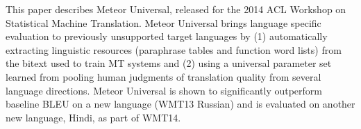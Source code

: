 This paper describes Meteor Universal, released for the 2014 ACL Workshop on Statistical Machine Translation.  Meteor Universal brings language specific evaluation to previously unsupported target languages by (1) automatically extracting linguistic resources (paraphrase tables and function word lists) from the bitext used to train MT systems and (2) using a universal parameter set learned from pooling human judgments of translation quality from several language directions.  Meteor Universal is shown to significantly outperform baseline BLEU on a new language  (WMT13 Russian) and is evaluated on another new language, Hindi, as part of WMT14.
